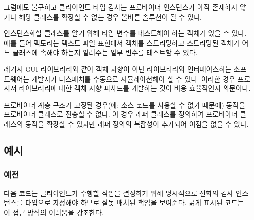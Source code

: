 \documentclass[a4paper,10pt,twoside]{book}
\begin{document}
그럼에도 불구하고 클라이언트 타입 검사는 프로바이더 인스턴스가 아직 존재하지 않거나 해당 클래스를 확장할 수 없는 경우 올바른 솔루션이 될 수 있다.

\begin{bulletlist}
\item 인스턴스화할 클래스를 알기 위해 타입 변수를 테스트해야 하는  객체가 있을 수 있다. 예를 들어 팩토리는 텍스트 파일 표현에서 객체를 스트리밍하고 스트리밍된 객체가 어느 클래스에 속해야 하는지 알려주는 일부 변수를 테스트할 수 있다.

\item 레거시 GUI 라이브러리와 같이 객체 지향이 아닌 라이브러리와 인터페이스하는 소프트웨어는 개발자가 디스패치를 수동으로 시뮬레이션해야 할 수 있다. 이러한 경우 프로시저 라이브러리에 대한 객체 지향 파사드를 개발하는 것이 비용 효율적인지 의문이다.

\item 프로바이더 계층 구조가 고정된 경우(예: 소스 코드를 사용할 수 없기 때문에) 동작을 프로바이더 클래스로 전송할 수 없다. 이 경우 래퍼 클래스를 정의하여 프로바이더 클래스의 동작을 확장할 수 있지만 래퍼 정의의 복잡성이 추가되어 이점을 없을 수 있다.
\end{bulletlist}

\subsection*{예시}

\subsubsection*{예전}

다음  코드는 클라이언트가 수행할 작업을 결정하기 위해 명시적으로 전화의 검사 인스턴스를 타입으로 지정해야 하므로 잘못 배치된 책임을 보여준다. 굵게 표시된 코드는 이 접근 방식의 어려움을 강조한다.

\end{document}

